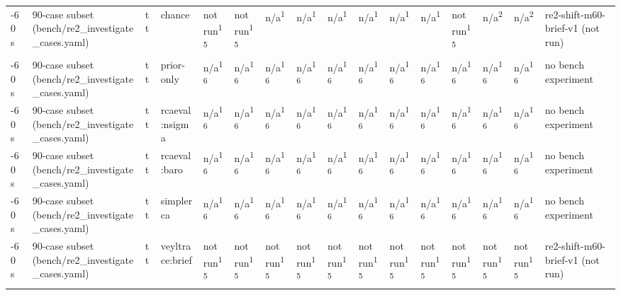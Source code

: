 \begin{table}[t]
\begin{tabular}{llllllllllllllll}
-60 s & 90-case subset (bench/re2\_investigate\_cases.yaml) & tt & chance & not run\textsuperscript{15} & not run\textsuperscript{15} & n/a\textsuperscript{1} & n/a\textsuperscript{1} & n/a\textsuperscript{1} & n/a\textsuperscript{1} & n/a\textsuperscript{1} & n/a\textsuperscript{1} & not run\textsuperscript{15} & n/a\textsuperscript{2} & n/a\textsuperscript{2} & re2-shift-m60-brief-v1 (not run) \\
-60 s & 90-case subset (bench/re2\_investigate\_cases.yaml) & tt & prior-only & n/a\textsuperscript{16} & n/a\textsuperscript{16} & n/a\textsuperscript{16} & n/a\textsuperscript{16} & n/a\textsuperscript{16} & n/a\textsuperscript{16} & n/a\textsuperscript{16} & n/a\textsuperscript{16} & n/a\textsuperscript{16} & n/a\textsuperscript{16} & n/a\textsuperscript{16} & no bench experiment \\
-60 s & 90-case subset (bench/re2\_investigate\_cases.yaml) & tt & rcaeval:nsigma & n/a\textsuperscript{16} & n/a\textsuperscript{16} & n/a\textsuperscript{16} & n/a\textsuperscript{16} & n/a\textsuperscript{16} & n/a\textsuperscript{16} & n/a\textsuperscript{16} & n/a\textsuperscript{16} & n/a\textsuperscript{16} & n/a\textsuperscript{16} & n/a\textsuperscript{16} & no bench experiment \\
-60 s & 90-case subset (bench/re2\_investigate\_cases.yaml) & tt & rcaeval:baro & n/a\textsuperscript{16} & n/a\textsuperscript{16} & n/a\textsuperscript{16} & n/a\textsuperscript{16} & n/a\textsuperscript{16} & n/a\textsuperscript{16} & n/a\textsuperscript{16} & n/a\textsuperscript{16} & n/a\textsuperscript{16} & n/a\textsuperscript{16} & n/a\textsuperscript{16} & no bench experiment \\
-60 s & 90-case subset (bench/re2\_investigate\_cases.yaml) & tt & simplerca & n/a\textsuperscript{16} & n/a\textsuperscript{16} & n/a\textsuperscript{16} & n/a\textsuperscript{16} & n/a\textsuperscript{16} & n/a\textsuperscript{16} & n/a\textsuperscript{16} & n/a\textsuperscript{16} & n/a\textsuperscript{16} & n/a\textsuperscript{16} & n/a\textsuperscript{16} & no bench experiment \\
-60 s & 90-case subset (bench/re2\_investigate\_cases.yaml) & tt & veyltrace:brief & not run\textsuperscript{15} & not run\textsuperscript{15} & not run\textsuperscript{15} & not run\textsuperscript{15} & not run\textsuperscript{15} & not run\textsuperscript{15} & not run\textsuperscript{15} & not run\textsuperscript{15} & not run\textsuperscript{15} & not run\textsuperscript{15} & not run\textsuperscript{15} & re2-shift-m60-brief-v1 (not run) \\

\end{tabular}
\end{table}
